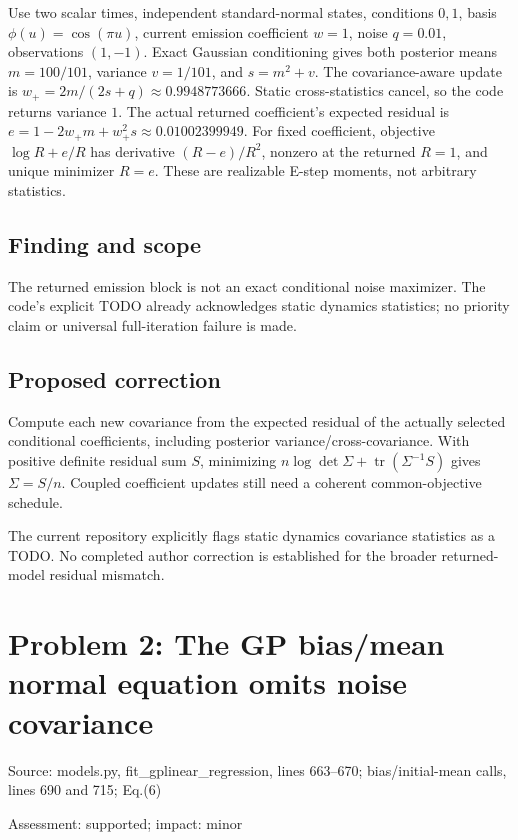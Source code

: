 \documentclass[11pt]{article}
\begin{document}
Use two scalar times, independent standard-normal states, conditions \(0,1\), basis \(\phi(u)=\cos(\pi u)\), current emission coefficient \(w=1\), noise \(q=0.01\), observations \((1,-1)\). Exact Gaussian conditioning gives both posterior means \(m=100/101\), variance \(v=1/101\), and \(s=m^2+v\). The covariance-aware update is \(w_+=2m/(2s+q)\approx0.9948773666\). Static cross-statistics cancel, so the code returns variance \(1\). The actual returned coefficient’s expected residual is \(e=1-2w_+m+w_+^2s\approx0.01002399949\). For fixed coefficient, objective \(\log R+e/R\) has derivative \((R-e)/R^2\), nonzero at the returned \(R=1\), and unique minimizer \(R=e\). These are realizable E-step moments, not arbitrary statistics.

\subsection*{Finding and scope}

The returned emission block is not an exact conditional noise maximizer. The code’s explicit TODO already acknowledges static dynamics statistics; no priority claim or universal full-iteration failure is made.

\subsection*{Proposed correction}

Compute each new covariance from the expected residual of the actually selected conditional coefficients, including posterior variance/cross-covariance. With positive definite residual sum \(S\), minimizing \(n\log\det\Sigma+\operatorname{tr}(\Sigma^{-1}S)\) gives \(\Sigma=S/n\). Coupled coefficient updates still need a coherent common-objective schedule.

The current repository explicitly flags static dynamics covariance statistics as a TODO. No completed author correction is established for the broader returned-model residual mismatch.

\section*{Problem 2: The GP bias/mean normal equation omits noise covariance}

Source: models.py, fit\_gplinear\_regression, lines 663–670; bias/initial-mean calls, lines 690 and 715; Eq.(6)

Assessment: supported; impact: minor
\end{document}
